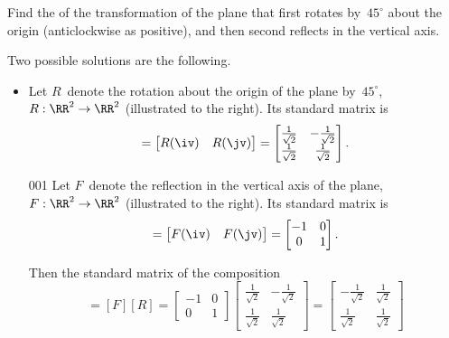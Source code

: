 \begin{example} 
Find the  of the transformation of the plane that first rotates by~\(45^\circ\) about the origin (anticlockwise as positive), and then second reflects in the vertical axis.
\newcommand{\rt}{\frac1{\sqrt2}}
\begin{solution} 
Two possible solutions are the following.
\begin{itemize}
\item 
\begin{figbox}{}
Let \(R\)~denote the rotation about the origin of the plane by~\(45^\circ\), \(R:\RR^2\to\RR^2\) (illustrated to the right).
Its standard matrix is
\begin{equation*}
[R]=\begin{bmatrix} R(\iv)&R(\jv) \end{bmatrix}
=\begin{bmatrix} \rt&-\rt\\\rt&\rt \end{bmatrix}.
\end{equation*}
\end{figbox}

\begin{figbox}{00{1}}
Let \(F\)~denote the reflection in the vertical axis of the plane, \(F:\RR^2\to\RR^2\) (illustrated to the right). 
Its standard matrix is
\begin{equation*}
[F]=\begin{bmatrix} F(\iv)&F(\jv) \end{bmatrix}
=\begin{bmatrix} -1&0\\0&1 \end{bmatrix}.
\end{equation*}
\end{figbox}

Then the standard matrix of the composition 
\begin{equation*}
[F\circ R]=[F][R]
=\begin{bmatrix} -1&0\\0&1 \end{bmatrix}
\begin{bmatrix} \rt&-\rt\\\rt&\rt \end{bmatrix}
=\begin{bmatrix} -\rt&\rt\\\rt&\rt \end{bmatrix}
\end{equation*}


\end{itemize}
\end{solution}
\end{example}
